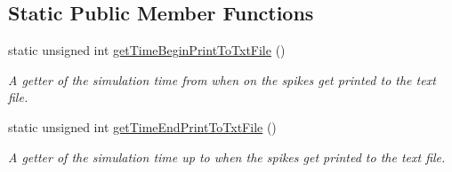 \subsection*{Static Public Member Functions}
\begin{DoxyCompactItemize}
\item 
static unsigned int \hyperlink{classSimulation_a474659676b4cc3e5c002a23df835be5c}{get\-Time\-Begin\-Print\-To\-Txt\-File} ()
\begin{DoxyCompactList}\small\item\em A getter of the simulation time from when on the spikes get printed to the text file. \end{DoxyCompactList}\item 
static unsigned int \hyperlink{classSimulation_a364b076cae1c94df74f3c608b02d9090}{get\-Time\-End\-Print\-To\-Txt\-File} ()
\begin{DoxyCompactList}\small\item\em A getter of the simulation time up to when the spikes get printed to the text file. \end{DoxyCompactList}\end{DoxyCompactItemize}
